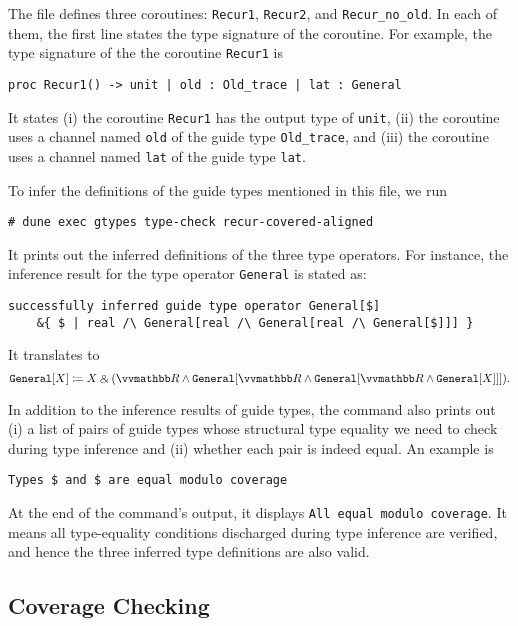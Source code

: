 The file defines three coroutines: \texttt{Recur1}, \texttt{Recur2},
and \texttt{Recur\_no\_old}.
%
In each of them, the first line states the type signature of the coroutine.
%
For example, the type signature of the the coroutine \texttt{Recur1} is
\begin{verbatim}
proc Recur1() -> unit | old : Old_trace | lat : General
\end{verbatim}
%
It states (i) the coroutine \texttt{Recur1} has the output type of
\texttt{unit}, (ii) the coroutine uses a channel named \texttt{old} of the guide
type \texttt{Old\_trace}, and (iii) the coroutine uses a channel named
\texttt{lat} of the guide type \texttt{lat}.

To infer the definitions of the guide types mentioned in this file, we run
\begin{verbatim}
# dune exec gtypes type-check recur-covered-aligned
\end{verbatim}
%
It prints out the inferred definitions of the three type operators.
%
For instance, the inference result for the type operator \texttt{General} is
stated as:
\begin{verbatim}
successfully inferred guide type operator General[$]
	&{ $ | real /\ General[real /\ General[real /\ General[$]]] }
\end{verbatim}
%
It translates to
\begin{equation*}
  \texttt{General} [X] \coloneq X \echoice (\treal \land \texttt{General} [\treal \land \texttt{General} [\treal \land \texttt{General} [X]]]).
\end{equation*}

In addition to the inference results of guide types, the command also prints out
(i) a list of pairs of guide types whose structural type equality we need to
check during type inference and (ii) whether each pair is indeed equal.
%
An example is
\begin{verbatim}
Types $ and $ are equal modulo coverage
\end{verbatim}
%
At the end of the command's output, it displays \texttt{All equal modulo
  coverage}.
%
It means all type-equality conditions discharged during type inference are
verified, and hence the three inferred type definitions are also valid.

\subsection{Coverage Checking}

